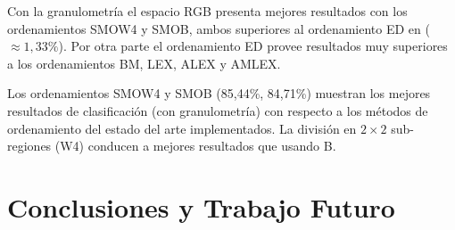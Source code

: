 Con la granulometría el espacio RGB presenta mejores resultados con los ordenamientos SMOW4 y SMOB, ambos superiores al ordenamiento ED en ($\approx 1,33 \% $). Por otra parte el ordenamiento ED provee resultados muy superiores a los ordenamientos BM, LEX, ALEX y AMLEX.

Los ordenamientos SMOW4 y SMOB (85,44\%, 84,71\%) muestran los mejores resultados de clasificación (con granulometría) con respecto a los métodos de ordenamiento del estado del arte implementados. La división en $2\times2$ sub-regiones (W4) conducen a mejores resultados que usando B.  

\section{Conclusiones y Trabajo Futuro}

